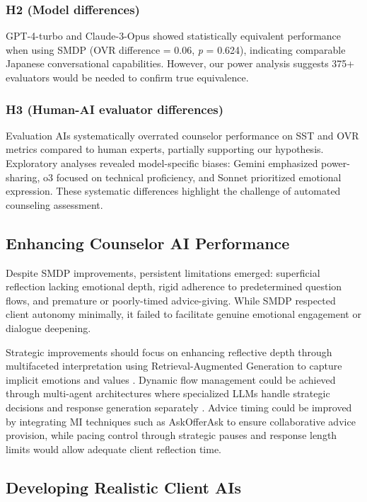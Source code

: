 \documentclass{wiley-article}
\begin{document}
\subsubsection*{H2 (Model differences)}
GPT-4-turbo and Claude-3-Opus showed statistically equivalent performance when using SMDP (OVR difference = 0.06, \emph{p} = 0.624), indicating comparable Japanese conversational capabilities. However, our power analysis suggests 375+ evaluators would be needed to confirm true equivalence.

\subsubsection*{H3 (Human-AI evaluator differences)}
Evaluation AIs systematically overrated counselor performance on SST and OVR metrics compared to human experts, partially supporting our hypothesis. Exploratory analyses revealed model-specific biases: Gemini emphasized power-sharing, o3 focused on technical proficiency, and Sonnet prioritized emotional expression. These systematic differences highlight the challenge of automated counseling assessment.

\subsection*{Enhancing Counselor AI Performance}

Despite SMDP improvements, persistent limitations emerged: superficial reflection lacking emotional depth, rigid adherence to predetermined question flows, and premature or poorly-timed advice-giving. While SMDP respected client autonomy minimally, it failed to facilitate genuine emotional engagement or dialogue deepening.

Strategic improvements should focus on enhancing reflective depth through multifaceted interpretation using Retrieval-Augmented Generation to capture implicit emotions and values \citep{arabiHabitCoachCustomising2024}. Dynamic flow management could be achieved through multi-agent architectures where specialized LLMs handle strategic decisions and response generation separately \citep{xuAutoCBTAutonomousMultiagent2025, kampmanMultiAgentDualDialogue2024}. Advice timing could be improved by integrating MI techniques such as Ask\textendash{}Offer\textendash{}Ask to ensure collaborative advice provision, while pacing control through strategic pauses and response length limits would allow adequate client reflection time.

\subsection*{Developing Realistic Client AIs}
\end{document}
